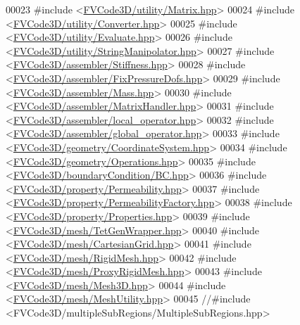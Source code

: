 \begin{DoxyCode}
00023 \textcolor{preprocessor}{#include <\hyperlink{Matrix_8hpp}{FVCode3D/utility/Matrix.hpp}>}
00024 \textcolor{preprocessor}{#include <\hyperlink{Converter_8hpp}{FVCode3D/utility/Converter.hpp}>}
00025 \textcolor{preprocessor}{#include <\hyperlink{Evaluate_8hpp}{FVCode3D/utility/Evaluate.hpp}>}
00026 \textcolor{preprocessor}{#include <\hyperlink{StringManipolator_8hpp}{FVCode3D/utility/StringManipolator.hpp}>}
00027 \textcolor{preprocessor}{#include <\hyperlink{Stiffness_8hpp}{FVCode3D/assembler/Stiffness.hpp}>}
00028 \textcolor{preprocessor}{#include <\hyperlink{FixPressureDofs_8hpp}{FVCode3D/assembler/FixPressureDofs.hpp}>}
00029 \textcolor{preprocessor}{#include <\hyperlink{Mass_8hpp}{FVCode3D/assembler/Mass.hpp}>}
00030 \textcolor{preprocessor}{#include <\hyperlink{MatrixHandler_8hpp}{FVCode3D/assembler/MatrixHandler.hpp}>}
00031 \textcolor{preprocessor}{#include <\hyperlink{local__operator_8hpp}{FVCode3D/assembler/local\_operator.hpp}>}
00032 \textcolor{preprocessor}{#include <\hyperlink{global__operator_8hpp}{FVCode3D/assembler/global\_operator.hpp}>}
00033 \textcolor{preprocessor}{#include <\hyperlink{CoordinateSystem_8hpp}{FVCode3D/geometry/CoordinateSystem.hpp}>}
00034 \textcolor{preprocessor}{#include <\hyperlink{Operations_8hpp}{FVCode3D/geometry/Operations.hpp}>}
00035 \textcolor{preprocessor}{#include <\hyperlink{BC_8hpp}{FVCode3D/boundaryCondition/BC.hpp}>}
00036 \textcolor{preprocessor}{#include <\hyperlink{Permeability_8hpp}{FVCode3D/property/Permeability.hpp}>}
00037 \textcolor{preprocessor}{#include <\hyperlink{PermeabilityFactory_8hpp}{FVCode3D/property/PermeabilityFactory.hpp}>}
00038 \textcolor{preprocessor}{#include <\hyperlink{Properties_8hpp}{FVCode3D/property/Properties.hpp}>}
00039 \textcolor{preprocessor}{#include <\hyperlink{TetGenWrapper_8hpp}{FVCode3D/mesh/TetGenWrapper.hpp}>}
00040 \textcolor{preprocessor}{#include <\hyperlink{CartesianGrid_8hpp}{FVCode3D/mesh/CartesianGrid.hpp}>}
00041 \textcolor{preprocessor}{#include <\hyperlink{RigidMesh_8hpp}{FVCode3D/mesh/RigidMesh.hpp}>}
00042 \textcolor{preprocessor}{#include <\hyperlink{ProxyRigidMesh_8hpp}{FVCode3D/mesh/ProxyRigidMesh.hpp}>}
00043 \textcolor{preprocessor}{#include <\hyperlink{Mesh3D_8hpp}{FVCode3D/mesh/Mesh3D.hpp}>}
00044 \textcolor{preprocessor}{#include <\hyperlink{MeshUtility_8hpp}{FVCode3D/mesh/MeshUtility.hpp}>}
00045 \textcolor{comment}{//#include <FVCode3D/multipleSubRegions/MultipleSubRegions.hpp>}
\end{DoxyCode}
